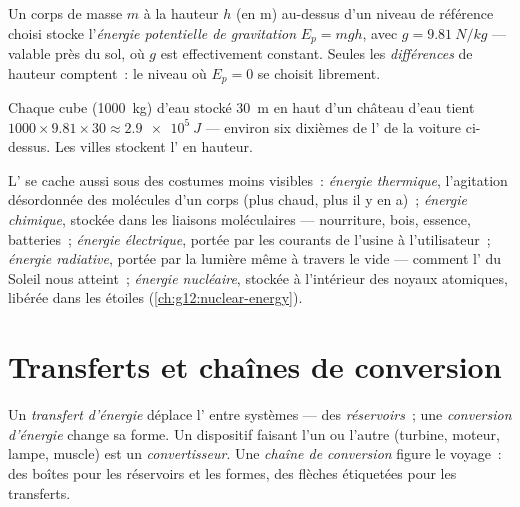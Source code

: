 \begin{definition}\label{def:g10:energy-conservation:potential}
Un corps de masse $m$ à la hauteur $h$ (en \unit{m}) au-dessus d'un
niveau de référence choisi stocke l'\emph{énergie potentielle de
gravitation} $E_p = m g h$,
avec $g = \qty{9.81}{N/kg}$ --- valable près du sol, où $g$ est
effectivement constant. Seules les \emph{différences} de hauteur
comptent~: le niveau où $E_p = 0$ se choisit librement.
\end{definition}

\begin{example}\label{ex:g10:energy-conservation:potential}
Chaque  cube (\qty{1000}{kg}) d'eau stocké \qty{30}{m}
en haut d'un château d'eau tient $1000 \times 9.81 \times 30 \approx
\qty{2.9e5}{J}$ --- environ six dixièmes de l' de la voiture ci-dessus. Les villes stockent
l' en hauteur.
\end{example}

\begin{definition}\label{def:g10:energy-conservation:forms}
L' se cache aussi sous des costumes moins visibles~:
\emph{énergie thermique}, l'agitation
désordonnée des molécules d'un corps (plus chaud, plus il y en a)~;
\emph{énergie chimique}, stockée dans les
liaisons moléculaires --- nourriture, bois, essence, batteries~;
\emph{énergie électrique}, portée par les
courants de l'usine à l'utilisateur~; \emph{énergie
radiative}, portée par la lumière même à
travers le vide --- comment l' du Soleil nous
atteint~; \emph{énergie nucléaire}, stockée
à l'intérieur des noyaux atomiques, libérée dans les étoiles
(\cref{ch:g12:nuclear-energy}).
\end{definition}

\section{Transferts et chaînes de conversion}

\begin{definition}\label{def:g10:energy-conservation:transfer}
Un \emph{transfert d'énergie} déplace
l' entre systèmes --- des
\emph{réservoirs}~; une \emph{conversion
d'énergie} change sa forme. Un dispositif
faisant l'un ou l'autre (turbine, moteur, lampe, muscle) est un
\emph{convertisseur}. Une \emph{chaîne de
conversion} figure le voyage~: des boîtes
pour les réservoirs et les formes, des flèches étiquetées pour les
transferts.
\end{definition}

